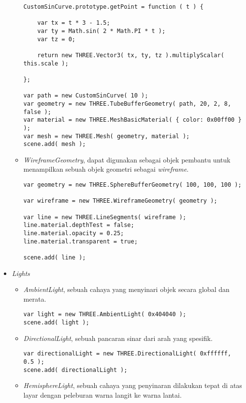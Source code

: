 \begin{itemize}
\begin{itemize}
\begin{lstlisting}
CustomSinCurve.prototype.getPoint = function ( t ) {

	var tx = t * 3 - 1.5;
	var ty = Math.sin( 2 * Math.PI * t );
	var tz = 0;

	return new THREE.Vector3( tx, ty, tz ).multiplyScalar( this.scale );

};

var path = new CustomSinCurve( 10 );
var geometry = new THREE.TubeBufferGeometry( path, 20, 2, 8, false );
var material = new THREE.MeshBasicMaterial( { color: 0x00ff00 } );
var mesh = new THREE.Mesh( geometry, material );
scene.add( mesh );
\end{lstlisting}

	\item {\it WireframeGeometry}, dapat digunakan sebagai objek pembantu untuk menampilkan sebuah objek geometri sebagai {\it wireframe}.
	
\begin{lstlisting}
var geometry = new THREE.SphereBufferGeometry( 100, 100, 100 );

var wireframe = new THREE.WireframeGeometry( geometry );

var line = new THREE.LineSegments( wireframe );
line.material.depthTest = false;
line.material.opacity = 0.25;
line.material.transparent = true;

scene.add( line );
\end{lstlisting}

	\end{itemize}
	
\item \textit{Lights}

	\begin{itemize}
	\item {\it AmbientLight}, sebuah cahaya yang menyinari objek secara global dan merata.
	
\begin{lstlisting}
var light = new THREE.AmbientLight( 0x404040 ); 
scene.add( light );
\end{lstlisting}
	
	\item {\it DirectionalLight}, sebuah pancaran sinar dari arah yang spesifik.
	
\begin{lstlisting}
var directionalLight = new THREE.DirectionalLight( 0xffffff, 0.5 );
scene.add( directionalLight );
\end{lstlisting}

	\item {\it HemisphereLight}, sebuah cahaya yang penyinaran dilakukan tepat di atas layar dengan peleburan warna langit ke warna lantai.
	

\end{itemize}
\end{itemize}
